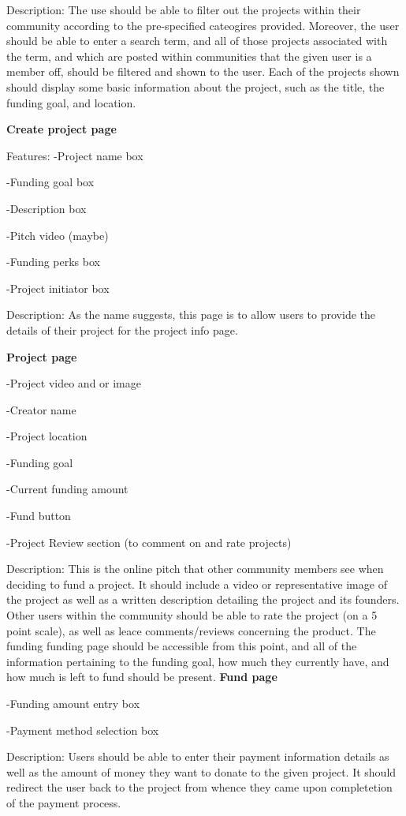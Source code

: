 \documentclass[12pt]{article}
\begin{document}
\begin{enumerate}
Description:
The use should be able to filter out the projects within their community according to the pre-specified cateogires provided.
Moreover, the user should be able to enter a search term, and all of those projects associated with the term, 
and which are posted within communities
that the given user is a member off, should be filtered and shown to the user.
Each of the projects shown should display some basic information about the project, such as the title, the funding goal, and location.

\textbf{Create project page}

Features:
-Project name box

-Funding goal box

-Description box

-Pitch video (maybe)

-Funding perks box

-Project initiator  box

Description:
As the name suggests, this page is to allow users to provide the details of their project for the project info page.

\textbf{Project page}

-Project video and or image

-Creator name

-Project location

-Funding goal

-Current funding amount

-Fund button

-Project Review section (to comment on and rate projects)

Description:
This is the online pitch that other community members see when deciding to fund a project.
It should include a video or representative image of the project as well as a written description detailing the 
project and its founders.
Other users within the community should be able to rate the project (on a 5 point scale), as well as leace comments/reviews
concerning the product. The funding funding page should be accessible from this point, and all of the information pertaining
to the funding goal, how much they currently have, and how much is left to fund should be present.
\textbf{Fund page}

-Funding amount entry box

-Payment method selection box

Description:
Users should be able to enter their payment information details as well as the amount of money they want to donate to
the given project.
It should redirect the user back to the project from whence they came upon completetion of the payment process.


\end{enumerate}
\end{document}

